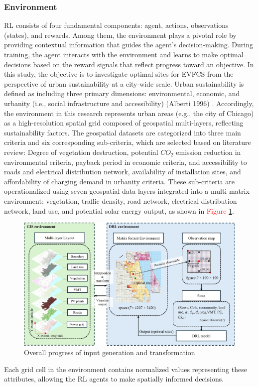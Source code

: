 \documentclass[preprint,12pt]{elsarticle}
\begin{document}
\subsubsection{Environment} 
RL consists of four fundamental components: agent, actions, observations (states), and rewards. Among them, the environment plays a pivotal role by providing contextual information that guides the agent's decision-making. During training, the agent interacts with the environment and learns to make optimal decisions based on the reward signals that reflect progress toward an objective. In this study, the objective is to investigate optimal sites for EVFCS from the perspective of urban sustainability at a city-wide scale. Urban sustainability is defined as including three primary dimensions: environmental, economic, and urbanity (i.e., social infrastructure and accessibility) (Alberti 1996) \cite{Alberti1996}. Accordingly, the environment in this research represents urban areas (e.g., the city of Chicago) as a high-resolution spatial grid composed of geospatial multi-layers, reflecting sustainability factors. The geospatial datasets are categorized into three main criteria and six corresponding sub-criteria, which are selected based on literature review: Degree of vegetation destruction, potential $CO_2$ emission reduction in environmental criteria, payback period in economic criteria, and accessibility to roads and electrical distribution network, availability of installation sites, and affordability of charging demand in urbanity criteria. These sub-criteria are operationalized using seven geospatial data layers integrated into a multi-matrix environment: vegetation, traffic density, road network, electrical distribution network, land use, and potential solar energy output, as shown in \textcolor{red}{Figure} \ref{fig:oeos}. 

\begin{figure}[h]
    \centering
    \includegraphics[width=0.8\linewidth]{paper/doc/result_figure/overall environment observation state v4.jpg}
    \caption{Overall progress of input generation and transformation}
    \label{fig:oeos}
\end{figure}
Each grid cell in the environment contains normalized values representing these attributes, allowing the RL agents to make spatially informed decisions.
\end{document}
